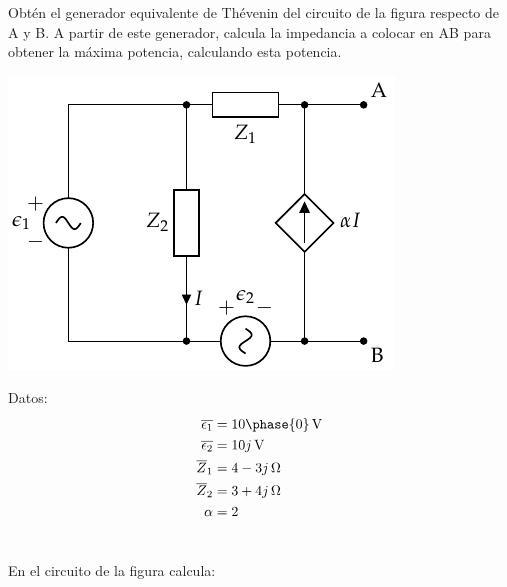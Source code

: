 \documentclass[12pt]{article}
\begin{document}
Obtén el generador equivalente de Thévenin del circuito de la figura respecto de A y B. A partir de este generador, calcula la impedancia a colocar en AB para obtener la máxima potencia, calculando esta potencia.

\begin{center}
\includegraphics{figs/Thevenin5}
\end{center}

Datos:
\begin{align*}
  \overline{\epsilon_1} &= \SI[parse-numbers=false]{10\phase{0}}{\volt}\\
  \overline{\epsilon_2} &= \SI[parse-numbers=false]{10j}{\volt}\\
  \overline{Z}_1 &= \SI[parse-numbers=false]{4 - 3j}{\ohm}\\
  \overline{Z}_2 &= \SI[parse-numbers=false]{3 + 4j}{\ohm}\\
  \alpha &= 2
\end{align*}

\noindent\hrulefill

\clearpage

\section{}

En el circuito de la figura calcula:
\end{document}
